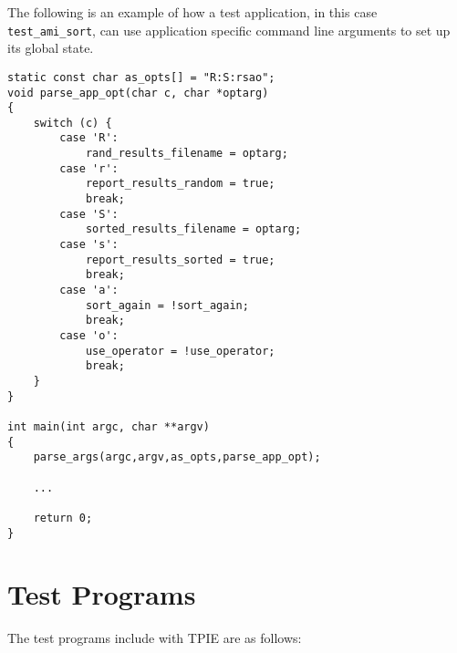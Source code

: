 The following is an example of how a test application, in this case
\lstinline|test_ami_sort|, can use application specific command line
arguments to set up its global state.

\begin{lstlisting}
static const char as_opts[] = "R:S:rsao";
void parse_app_opt(char c, char *optarg)
{
    switch (c) {
        case 'R':
            rand_results_filename = optarg;
        case 'r':
            report_results_random = true;
            break;
        case 'S':
            sorted_results_filename = optarg;
        case 's':
            report_results_sorted = true;
            break;
        case 'a':
            sort_again = !sort_again;
            break;
        case 'o':
            use_operator = !use_operator;
            break;
    }
}

int main(int argc, char **argv)
{
    parse_args(argc,argv,as_opts,parse_app_opt);

    ...

    return 0;
}
\end{lstlisting}

\section{Test Programs}

The test programs include with TPIE are as follows:

